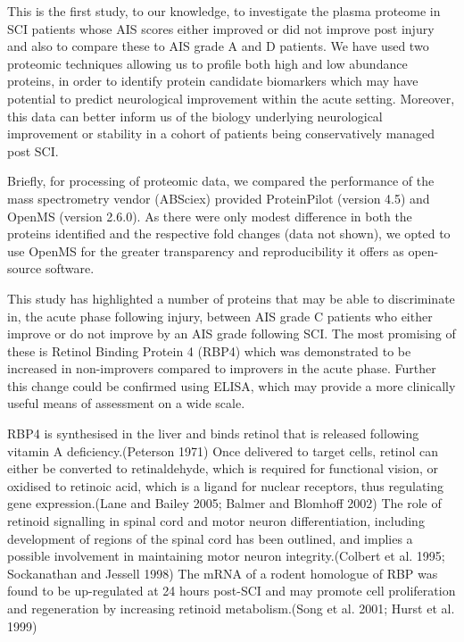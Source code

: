 \documentclass[
]{article}
\begin{document}
\begin{landscape}
\begin{landscape}
This is the first study, to our knowledge, to investigate the plasma proteome in SCI patients whose AIS scores either improved or did not improve post injury and also to compare these to AIS grade A and D patients.
We have used two proteomic techniques allowing us to profile both high and low abundance proteins, in order to identify protein candidate biomarkers which may have potential to predict neurological improvement within the acute setting.
Moreover, this data can better inform us of the biology underlying neurological improvement or stability in a cohort of patients being conservatively managed post SCI.

Briefly, for processing of proteomic data, we compared the performance of the mass spectrometry vendor (ABSciex) provided ProteinPilot (version 4.5) and OpenMS (version 2.6.0).
As there were only modest difference in both the proteins identified and the respective fold changes (data not shown), we opted to use OpenMS for the greater transparency and reproducibility it offers as open-source software.

This study has highlighted a number of proteins that may be able to discriminate in, the acute phase following injury, between AIS grade C patients who either improve or do not improve by an AIS grade following SCI.
The most promising of these is Retinol Binding Protein 4 (RBP4) which was demonstrated to be increased in non-improvers compared to improvers in the acute phase.
Further this change could be confirmed using ELISA, which may provide a more clinically useful means of assessment on a wide scale.

RBP4 is synthesised in the liver and binds retinol that is released following vitamin A deficiency.(Peterson 1971)
Once delivered to target cells, retinol can either be converted to retinaldehyde, which is required for functional vision, or oxidised to retinoic acid, which is a ligand for nuclear receptors, thus regulating gene expression.(Lane and Bailey 2005; Balmer and Blomhoff 2002)
The role of retinoid signalling in spinal cord and motor neuron differentiation, including development of regions of the spinal cord has been outlined, and implies a possible involvement in maintaining motor neuron integrity.(Colbert et al. 1995; Sockanathan and Jessell 1998)
The mRNA of a rodent homologue of RBP was found to be up-regulated at 24 hours post-SCI and may promote cell proliferation and regeneration by increasing retinoid metabolism.(Song et al. 2001; Hurst et al. 1999)


\end{landscape}
\end{landscape}
\end{document}
